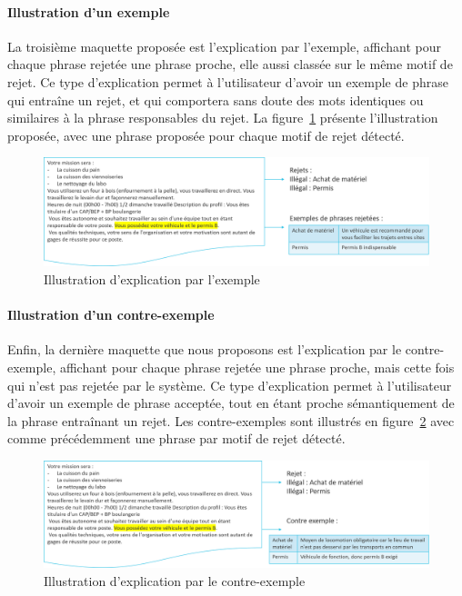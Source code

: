 \paragraph{Illustration d'un exemple}
 La troisième maquette proposée est l'explication par l'exemple, affichant pour chaque phrase rejetée une phrase proche, elle aussi classée sur le même motif de rejet.
 Ce type d'explication permet à l'utilisateur d'avoir un exemple de phrase qui entraîne un rejet, et qui comportera sans doute des mots identiques ou similaires à la phrase responsables du rejet. La figure~\ref{fig:prototype_exemple} présente l'illustration proposée, avec une phrase proposée pour chaque motif de rejet détecté.
 \begin{figure}[htpb!]
     \includegraphics[width=\textwidth]{./S2-Explicabilite_locale/figures/prototype_exemple.png}
     \caption{Illustration d'explication par l'exemple}
     \label{fig:prototype_exemple}
 \end{figure}

\paragraph{Illustration d'un contre-exemple}
 Enfin, la dernière maquette que nous proposons est l'explication par le contre-exemple, affichant pour chaque phrase rejetée une phrase proche, mais cette fois qui n'est pas rejetée par le système.
 Ce type d'explication permet à l'utilisateur d'avoir un exemple de phrase acceptée, tout en étant proche sémantiquement de la phrase entraînant un rejet. Les contre-exemples sont illustrés en figure~\ref{fig:prototype_contre_exemple} avec comme précédemment une phrase par motif de rejet détecté.
 \begin{figure}[htpb!]
     \includegraphics[width=\textwidth]{./S2-Explicabilite_locale/figures/prototype_contre_exemple.png}
     \caption{Illustration d'explication par le contre-exemple}
     \label{fig:prototype_contre_exemple}
 \end{figure}

